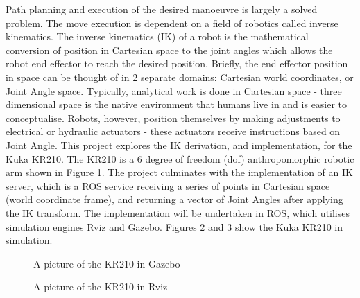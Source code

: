 \documentclass[a4paper]{article}
\begin{document}
Path planning and execution of the desired manoeuvre is largely a solved problem. The move execution is dependent on a field of robotics called inverse kinematics. The inverse kinematics (IK) of a robot is the mathematical conversion of position in Cartesian space to the joint angles which allows the robot end effector to reach the desired position. Briefly, the end effector position in space can be thought of in 2 separate domains: Cartesian world coordinates, or Joint Angle space. Typically, analytical work is done in Cartesian space - three dimensional space is the native environment that humans live in and is easier to conceptualise. Robots, however, position themselves by making adjustments to electrical or hydraulic actuators - these actuators receive instructions based on Joint Angle. This project explores the IK derivation, and implementation, for the Kuka KR210. The KR210 is a 6 degree of freedom (dof) anthropomorphic robotic arm shown in Figure 1. The project culminates with the implementation of an IK server, which is a ROS service receiving a series of points in Cartesian space (world coordinate frame), and returning a vector of Joint Angles after applying the IK transform. The implementation will be undertaken in ROS, which utilises simulation engines Rviz and Gazebo. Figures 2 and 3 show the Kuka KR210 in simulation.

\begin{figure}[h]
\centering
\begin{minipage}[t]{0.45\linewidth}
\centering
{}
\caption{A picture of the KR210 in Gazebo}
\end{minipage}
\hspace{1cm}
\begin{minipage}[t]{0.45\linewidth}
\centering
{}
\caption{A picture of the KR210 in Rviz}
\end{minipage}
\end{figure}
\end{document}
